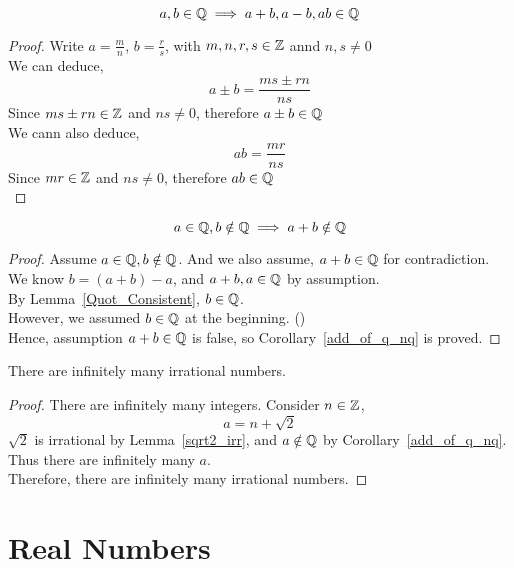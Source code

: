 \documentclass[a4paper]{article}
\begin{document}
\begin{nlemma}\label{Quot_Consistent}
$$a,b \in \mathbb{Q} \implies a+b, a-b, ab \in \mathbb{Q}$$
\end{nlemma}
\begin{proof}
Write $a = \frac{m}{n}$, $b = \frac{r}{s}$, with $m,n,r,s \in \mathbb{Z}$ annd $n,s \neq 0$\\
We can deduce, $$a \pm b = \frac{ms \pm rn}{ns}$$
Since $ms \pm rn \in \mathbb{Z}$ and $ns \neq 0$, therefore $a \pm b \in \mathbb{Q}$\\
We cann also deduce, $$ab = \frac{mr}{ns}$$
Since $mr \in \mathbb{Z}$ and $ns \neq 0$, therefore $ab \in \mathbb{Q}$\\
\end{proof}

\begin{ncor}\label{add_of_q_nq}
$$a \in \mathbb{Q}, b \notin \mathbb{Q} \implies a + b \notin \mathbb{Q}$$
\end{ncor}
\begin{proof}
Assume $a \in \mathbb{Q}, b \notin \mathbb{Q}$. And we also assume, $a + b \in \mathbb{Q}$ for contradiction.\\
We know $b = (a + b) - a$, and $a+b, a \in \mathbb{Q}$ by assumption.\\
By Lemma~\ref{Quot_Consistent}, $b \in \mathbb{Q}$.\\
However, we assumed $b \in \mathbb{Q}$ at the beginning. (\contradiction)\\
Hence, assumption $a + b \in \mathbb{Q}$ is false, so Corollary~\ref{add_of_q_nq} is proved.
\end{proof}

\begin{ncor}\label{inf_irr_num}
There are infinitely many irrational numbers.
\end{ncor}
\begin{proof}
There are infinitely many integers.
Consider $n \in \mathbb{Z}$, $$a = n + \sqrt{2}$$
$\sqrt{2}$ is irrational by Lemma~\ref{sqrt2_irr}, and $a \notin \mathbb{Q}$ by Corollary~\ref{add_of_q_nq}.\\
Thus there are infinitely many $a$.\\
Therefore, there are infinitely many irrational numbers.
\end{proof}

\section{Real Numbers}
\end{document}
